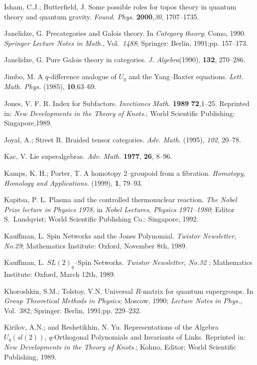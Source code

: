 \documentclass[12pt]{article}
\theoremstyle{plain}
\theoremstyle{definition}
\numberwithin{equation}{section}
\begin{document}
\begin{thebibliography}{199}
Isham, C.J.; Butterfield, J.  Some possible roles for topos theory in quantum theory and quantum gravity. {\em Found. Phys.} {\bf 2000},{\em 30}, 1707--1735. %

Janelidze, G.  Precategories and Galois theory. In \emph{Category theory}; Como, 1990. {\em Springer Lecture Notes in Math.}, Vol.~\emph{1488}; Springer: Berlin, 1991;pp. 157--173.

Janelidze, G. Pure Galois theory in categories. \emph{J. Algebra}(1990), {\bf 132}, 270--286.

Jimbo, M.  A $q$-difference analogue of $U_g$ and the Yang--Baxter equations. \emph{Lett. Math. Phys.} (1985), {\bf 10},63--69. 

Jones, V. F. R. Index for Subfactors. \emph{Invetiones Math.} {\bf 1989} {\bf  72},1--25. Reprinted in: \emph{New Developments in the Theory of Knots.}; World Scientific Publishing: Singapore,1989.

Joyal, A.; Street R.  Braided tensor categories. \emph{Adv. Math.} (1995), \emph{102}, 20--78.

Kac, V.  Lie superalgebras. \emph{Adv. Math.} {\bf 1977}, {\bf 26}, 8--96.

Kamps, K. H.; Porter, T.  A homotopy 2--groupoid from a fibration. \emph{Homotopy, Homology and Applications.} (1999), {\bf 1}, 79--93.

Kapitsa,  P. L.  Plasma and the controlled thermonuclear reaction. \emph{The Nobel Prize lecture in Physics 1978}, in \emph{Nobel Lectures, Physics 1971--1980}; Editor S.~Lundqvist; World Scientific Publishing Co.: Singapore, 1992.

Kauffman, L. Spin Networks and the Jones Polynomial. \emph{Twistor Newsletter, No.29}; Mathematics Institute: Oxford, November 8th, 1989.

Kauffman, L.  $SL(2)_q$--Spin Networks. \emph{Twistor Newsletter, No.32 }; Mathematics Institute: Oxford, March 12th, 1989.

Khoroshkin, S.M.; Tolstoy, V.N. Universal $R$-matrix for quantum supergroups.  In {\em Group Theoretical Methods in Physics}; Moscow, 1990; {\em Lecture Notes in Phys.}, Vol.~382; Springer: Berlin, 1991;pp. 229--232.

Kirilov, A.N.; and Reshetikhin, N. Yu. Representations of the Algebra $U_q(sl(2))$, $q$-Orthogonal Polynomials and Invariants of Links. Reprinted in: {\em New Developments in the Theory of Knots.}; Kohno, Editor; World Scientific Publishing, 1989.


\end{thebibliography}
\end{document}
